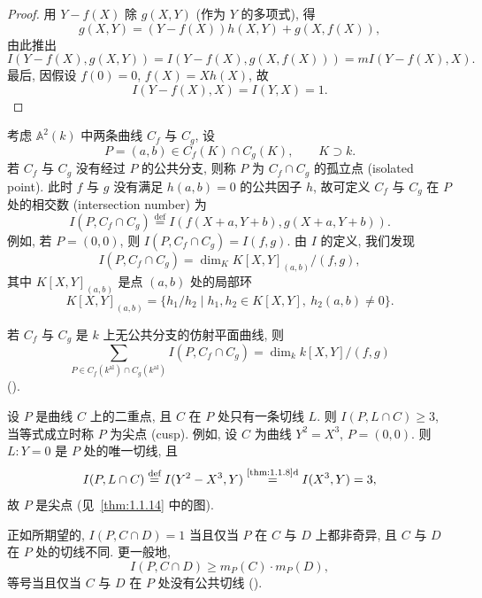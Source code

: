 \begin{proof}
用 $Y - f(X)$ 除 $g(X,Y)$ (作为 $Y$ 的多项式), 得
\[
g(X,Y) = (Y - f(X))h(X,Y) + g(X,f(X)),
\]
由此推出
\[
I(Y - f(X), g(X,Y)) = I(Y - f(X), g(X,f(X))) = mI(Y - f(X), X).
\]
最后, 因假设 $f(0) = 0$, $f(X) = Xh(X)$, 故
\[
I(Y - f(X), X) = I(Y, X) = 1.
\]
\end{proof}

考虑 $\mathbb{A}^2(k)$ 中两条曲线 $C_f$ 与 $C_g$, 设
\[
P = (a,b)\in C_f(K)\cap C_g(K), \qquad K\supset k.
\]
若 $C_f$ 与 $C_g$ 没有经过 $P$ 的公共分支, 则称 $P$ 为 $C_f\cap C_g$ 的孤立点 (isolated point). 此时 $f$ 与 $g$ 没有满足 $h(a,b) = 0$ 的公共因子 $h$, 故可定义 $C_f$ 与 $C_g$ 在 $P$ 处的相交数 (intersection number) 为
\[
I(P, C_f\cap C_g) \overset{\text{def}}{=} I(f(X+a, Y+b), g(X+a, Y+b)).
\]
例如, 若 $P = (0,0)$, 则 $I(P, C_f\cap C_g) = I(f,g)$. 由 $I$ 的定义, 我们发现
\[
I(P, C_f\cap C_g) = \dim_K K[X,Y]_{(a,b)}/(f,g),
\]
其中 $K[X,Y]_{(a,b)}$ 是点 $(a,b)$ 处的局部环
\[
K[X,Y]_{(a,b)} = \{h_1/h_2 \mid h_1,h_2\in K[X,Y],\ h_2(a,b)\neq 0\}.
\]

若 $C_f$ 与 $C_g$ 是 $k$ 上无公共分支的仿射平面曲线, 则
\[
\sum_{P\in C_f(k^{\mathrm{al}})\cap C_g(k^{\mathrm{al}})} I(P, C_f\cap C_g) = \dim_k k[X,Y]/(f,g)
\]
(\cite[\S3.3 (9)]{fulton1969}).

\begin{remark} \label{thm:1.1.12} 
设 $P$ 是曲线 $C$ 上的二重点, 且 $C$ 在 $P$ 处只有一条切线 $L$. 则 $I(P, L\cap C)\ge 3$, 当等式成立时称 $P$ 为尖点 (cusp). 例如, 设 $C$ 为曲线 $Y^2 = X^3$, $P = (0,0)$. 则 $L\colon Y = 0$ 是 $P$ 处的唯一切线, 且
\[
I(P, L\cap C) \overset{\text{def}}{=} I(Y^2 - X^3, Y) \overset{\text{\ref{thm:1.1.8}d}}{=} I(X^3, Y) = 3,
\]
故 $P$ 是尖点 (见~\ref{thm:1.1.14} 中的图).
\end{remark}

\begin{remark} \label{thm:1.1.13} 
正如所期望的, $I(P, C\cap D) = 1$ 当且仅当 $P$ 在 $C$ 与 $D$ 上都非奇异, 且 $C$ 与 $D$ 在 $P$ 处的切线不同. 更一般地,
\[
I(P, C\cap D) \ge m_P(C)\cdot m_P(D),
\]
等号当且仅当 $C$ 与 $D$ 在 $P$ 处没有公共切线 (\cite[\S3.3 (5)]{fulton1969}).
\end{remark}

